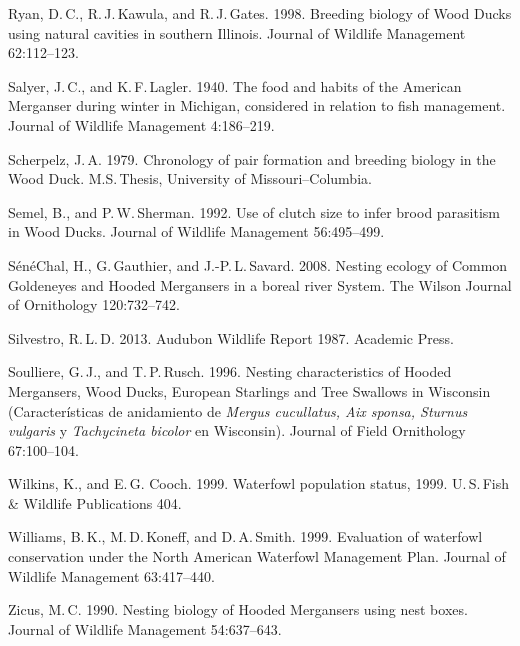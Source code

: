 \begin{hangparas}{2em}{1}
	Ryan, D.\,C., R.\,J.\,Kawula, and R.\,J.\,Gates. 1998. Breeding biology of Wood Ducks using natural cavities in southern Illinois. Journal of Wildlife Management 62:112–123. 
	
	Salyer, J.\,C., and K.\,F.\,Lagler. 1940. The food and habits of the American Merganser during winter in Michigan, considered in relation to fish management. Journal of Wildlife Management 4:186–219. 
	
	Scherpelz, J.\,A. 1979. Chronology of pair formation and breeding biology in the Wood Duck. M.S.\,Thesis, University of Missouri--Columbia. 
	
	Semel, B., and P.\,W.\,Sherman. 1992. Use of clutch size to infer brood parasitism in Wood Ducks. Journal of Wildlife Management 56:495–499. 
	
	SénéChal, H., G.\,Gauthier, and J.-P.\,L.\,Savard. 2008. Nesting ecology of Common Goldeneyes and Hooded Mergansers in a boreal river System. The Wilson Journal of Ornithology 120:732–742. 
	
	Silvestro, R.\,L.\,D. 2013. Audubon Wildlife Report 1987. Academic Press. 
	
	Soulliere, G.\,J., and T.\,P.\,Rusch. 1996. Nesting characteristics of Hooded Mergansers, Wood Ducks, European Starlings and Tree Swallows in Wisconsin (Características de anidamiento de \textit{Mergus cucullatus, Aix sponsa, Sturnus vulgaris} y \textit{Tachycineta bicolor} en Wisconsin). Journal of Field Ornithology 67:100–104. 
	
	Wilkins, K., and E.\,G. Cooch. 1999. Waterfowl population status, 1999. U.\,S.\,Fish \& Wildlife Publications 404. 
	
	Williams, B.\,K., M.\,D.\,Koneff, and D.\,A.\,Smith. 1999. Evaluation of waterfowl conservation under the North American Waterfowl Management Plan. Journal of Wildlife Management 63:417–440. 
	
	Zicus, M.\,C. 1990. Nesting biology of Hooded Mergansers using nest boxes. Journal of Wildlife Management 54:637–643. 
	
\end{hangparas}